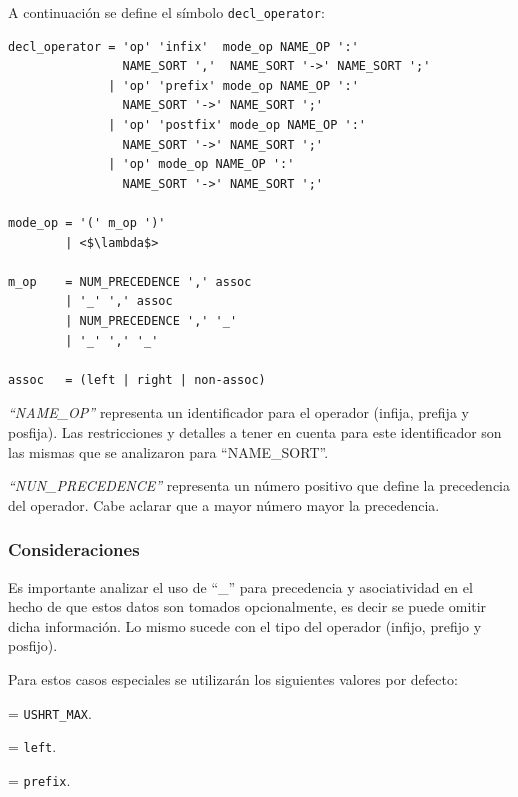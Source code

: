 A continuación se define el símbolo \texttt{decl\_operator}:

\begin{lstlisting}[escapeinside=<>, frame=shadowbox, rulesepcolor=\color{blue}, language=inform ]
decl_operator = 'op' 'infix'  mode_op NAME_OP ':'
                NAME_SORT ','  NAME_SORT '->' NAME_SORT ';' 
              | 'op' 'prefix' mode_op NAME_OP ':'
                NAME_SORT '->' NAME_SORT ';'               
              | 'op' 'postfix' mode_op NAME_OP ':'
                NAME_SORT '->' NAME_SORT ';'
              | 'op' mode_op NAME_OP ':'
                NAME_SORT '->' NAME_SORT ';'

mode_op = '(' m_op ')'
        | <$\lambda$>

m_op    = NUM_PRECEDENCE ',' assoc
        | '_' ',' assoc
        | NUM_PRECEDENCE ',' '_'
        | '_' ',' '_'

assoc   = (left | right | non-assoc) 
\end{lstlisting}

\textit{``NAME\_OP''} representa un identificador para el operador (infija, prefija y posfija). Las restricciones y detalles a tener en cuenta para este identificador son las mismas que se analizaron para ``NAME\_SORT''.

\textit{``NUN\_PRECEDENCE''} representa un número positivo que define la precedencia del operador. Cabe aclarar que a mayor número mayor la precedencia.

\subsubsection*{Consideraciones}

Es importante analizar el uso de ``\_'' para precedencia y asociatividad en el hecho de que estos datos son tomados opcionalmente, es decir se puede omitir dicha información. Lo mismo sucede con el tipo del operador (infijo, prefijo y posfijo). 

Para estos casos especiales se utilizarán los siguientes valores por defecto:

\begin{description}
\label{desc:default}
\item [Precedencia] = \texttt{USHRT\_MAX}.

\item [Asociatividad] = \texttt{left}.

\item [Tipo de operador] = \texttt{prefix}.
\end{description}


